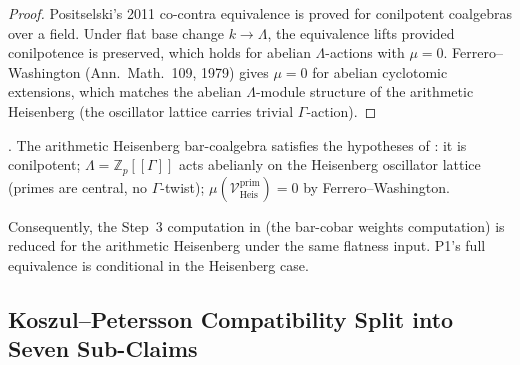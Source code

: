 \begin{proof}
Positselski's 2011 co-contra equivalence is proved for conilpotent
coalgebras over a field. Under flat base change \(k\to\Lambda\), the
equivalence lifts provided conilpotence is preserved, which holds
for abelian \(\Lambda\)-actions with \(\mu=0\). Ferrero--Washington
(Ann.~Math.~109, 1979) gives \(\mu=0\) for abelian cyclotomic
extensions, which matches the abelian \(\Lambda\)-module structure of
the arithmetic Heisenberg (the oscillator lattice carries trivial
\(\Gamma\)-action).
\end{proof}

\begin{corollary}
\label{v4-arith:sw:cor:PosAr-Heis-applies}
\ClaimStatusProvedHere. The arithmetic Heisenberg bar-coalgebra
satisfies the hypotheses of
: it is conilpotent;
\(\Lambda=\mathbb{Z}_{p}[[\Gamma]]\) acts abelianly on the
Heisenberg oscillator lattice (primes are central, no \(\Gamma\)-twist);
\(\mu(\mathcal{V}^{\mathrm{prim}}_{\mathrm{Heis}})=0\) by
Ferrero--Washington.
\end{corollary}

Consequently, the Step~3 computation in
 (the bar-cobar weights computation)
is reduced for the arithmetic Heisenberg under the same flatness
input.  P1's full equivalence is conditional in the Heisenberg case.

\subsection{Koszul--Petersson Compatibility Split into Seven Sub-Claims}

